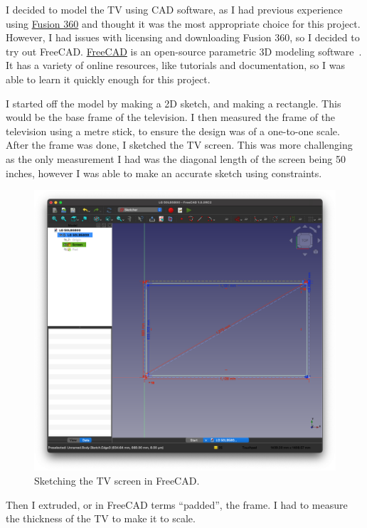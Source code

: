 \documentclass[12pt, letterpaper]{article}
\begin{document}
I decided to model the TV using CAD software, as I had previous
experience using
\href{https://www.autodesk.com/products/fusion-360/overview}{Fusion
360} and thought it was the most appropriate choice for this project.
However, I had issues with licensing and downloading Fusion 360, so I
decided to try out FreeCAD. \href{https://www.freecad.org}{FreeCAD}
is an open-source parametric 3D modeling
software~\autocite{jolahde-2018}. It has a variety of online
resources, like tutorials and documentation, so I was able to learn
it quickly enough for this project.

I started off the model by making a 2D sketch, and making a
rectangle. This would be the base frame of the television. I then
measured the frame of the television using a metre stick, to ensure
the design was of a one-to-one scale. After the frame was done, I
sketched the TV screen. This was more challenging as the only
measurement I had was the diagonal length of the screen being 50
inches, however I was able to make an accurate sketch using constraints.

\begin{figure}[H]
  \medskip
  \centering
  \includegraphics[width=1\linewidth]{a1}
  \caption{Sketching the TV screen in FreeCAD.}
  \medskip
  \label{fig:a1}
\end{figure}

Then I extruded, or in FreeCAD terms ``padded'', the frame. I had to
measure the thickness of the TV to make it to scale.
\end{document}
